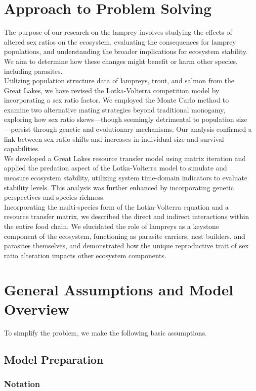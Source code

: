 \documentclass[12pt]{article}
\begin{document}
\section{Approach to Problem Solving}
\quad The purpose of our research on the lamprey involves studying the effects of altered sex ratios on the ecosystem,
evaluating the consequences for lamprey populations, and understanding the broader implications for ecosystem
stability. We aim to determine how these changes might benefit or harm other species, including parasites.
\\
Utilizing population structure data of lampreys, trout, and salmon from the Great Lakes, we have revised the
Lotka-Volterra competition model by incorporating a sex ratio factor. We employed the Monte Carlo method to
examine two alternative mating strategies beyond traditional monogamy, exploring how sex ratio skews—though
seemingly detrimental to population size—persist through genetic and evolutionary mechanisms. Our analysis
confirmed a link between sex ratio shifts and increases in individual size and survival capabilities.
\\
We developed a Great Lakes resource transfer model using matrix iteration and applied the predation aspect
of the Lotka-Volterra model to simulate and measure ecosystem stability, utilizing system time-domain
indicators to evaluate stability levels. This analysis was further enhanced by incorporating genetic
perspectives and species richness.
\\
Incorporating the multi-species form of the Lotka-Volterra equation and a resource transfer matrix, we
described the direct and indirect interactions within the entire food chain. We elucidated the role of
lampreys as a keystone component of the ecosystem, functioning as parasite carriers, nest builders,
and parasites themselves, and demonstrated how the unique reproductive trait of sex ratio alteration
impacts other ecosystem components.
\section{General Assumptions and Model Overview}
To simplify the problem, we make the following basic assumptions.
\subsection*{Model Preparation}
\subsubsection*{Notation}
\end{document}
